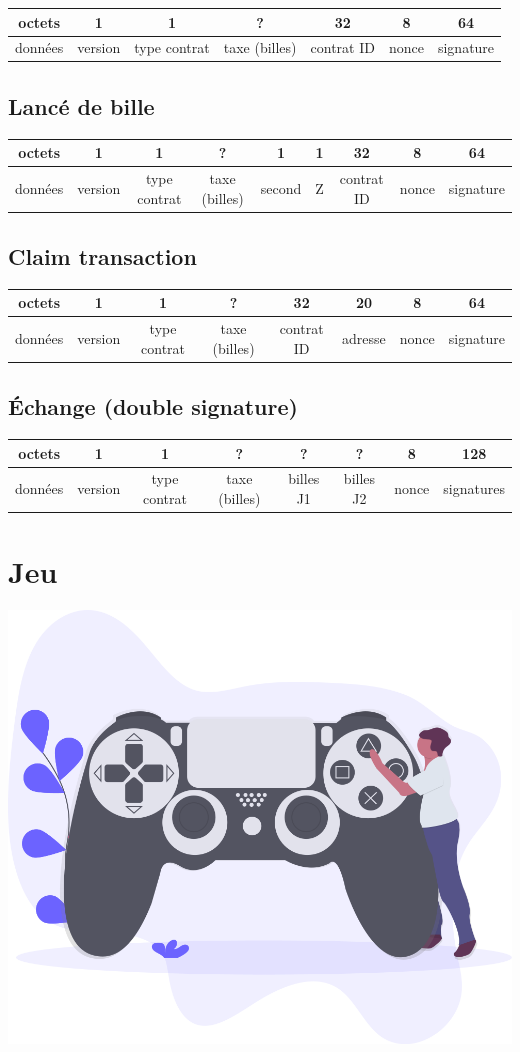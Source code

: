 \documentclass{article}
\begin{document}
\hspace*{-1cm}%
\begin{tabular}{ |c|c|c|c|c|c|c|} 
 \hline
 octets & 1 & 1 & ? & 32 & 8 & 64\\ 
 \hline
    données & version & type contrat & taxe (billes) & contrat ID & nonce & signature\\ 
 \hline
\end{tabular}

\subsection{Lancé de bille}
\hspace*{-1cm}%
\begin{tabular}{ |c|c|c|c|c|c|c|c|c|} 
 \hline
 octets & 1 & 1 & ? & 1 & 1 & 32 & 8 & 64 \\ 
 \hline
    données & version & type contrat & taxe (billes) & second & Z & contrat ID & nonce & signature\\ 
 \hline
\end{tabular}

\subsection{Claim transaction}
\hspace*{-1cm}%
\begin{tabular}{ |c|c|c|c|c|c|c|c|} 
 \hline
 octets & 1 & 1 & ? & 32 & 20 & 8 & 64 \\ 
 \hline
    données & version & type contrat & taxe (billes) & contrat ID & adresse & nonce & signature\\ 
 \hline
\end{tabular}

\subsection{Échange (double signature)}
\hspace*{-1cm}%
\begin{tabular}{ |c|c|c|c|c|c|c|c|} 
 \hline
 octets & 1 & 1 & ? & ? & ? & 8 & 128\\ 
 \hline
    données & version & type contrat & taxe (billes) & billes J1 & billes J2 & nonce & signatures\\ 
 \hline
\end{tabular}

\section{Jeu}
\includegraphics[width=0.3\linewidth]{assets/gaming.png}\\
\end{document}

